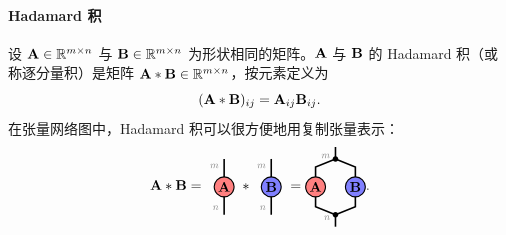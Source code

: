 \paragraph{Hadamard 积}
设 $\mathbf{A}\in\mathbb{R}^{m\times n}$ 与 $\mathbf{B}\in\mathbb{R}^{m\times n}$ 为形状相同的矩阵。$\mathbf{A}$ 与 $\mathbf{B}$ 的 Hadamard 积（或称逐分量积）是矩阵  $\mathbf{A}*\mathbf{B}\in\mathbb{R}^{m\times n}$，按元素定义为 
$$(\mathbf{A}*\mathbf{B})_{ij} = \mathbf{A}_{ij}\mathbf{B}_{ij}.$$
在张量网络图中，Hadamard 积可以很方便地用复制张量表示：
\begin{equation*}
\Ab\hadam\Bb =
     \begin{tikzpicture}[baseline=\baseline]
    \tikzset{tensor/.style = {minimum size = 0.5cm,shape = circle,thick,draw=black,inner sep = 0pt}, edge/.style   = {thick,line width=.4mm},every loop/.style={}}
    \def\y{0}
    \def\x{0}
    \draw[edge] (\x,\y-0.7) -- (\x,\y+0.7)  node [very near end,left] {\edgelabel{$m$}} node [very near start,left] {\edgelabel{$n$}} ;
    \node[tensor,fill=red!50!white] (A) at (\x,\y){$\Ab$};
    \end{tikzpicture} 
    \ \hadam %
    \begin{tikzpicture}[baseline=\baseline]
    \tikzset{tensor/.style = {minimum size = 0.5cm,shape = circle,thick,draw=black,inner sep = 0pt}, edge/.style   = {thick,line width=.4mm},every loop/.style={}}
    \def\y{0}
    \def\x{0}
    \draw[edge] (\x,\y-0.7) -- (\x,\y+0.7)node [very near end,left] {\edgelabel{$m$}} node [very near start,left] {\edgelabel{$n$}} ;
    \node[tensor,fill=blue!50!white] (B) at (\x,\y){$\Bb$};
    \end{tikzpicture}
\ =
\begin{tikzpicture}[baseline=\baseline]
    \tikzset{tensor/.style = {minimum size = 0.5cm,shape = circle,thick,draw=black,inner sep = 0pt}, edge/.style   = {thick,line width=.4mm},every loop/.style={}}
    \def\y{0}
    \def\x{0}
    \node[tensor,fill=red!50!white] (A) at (\x,\y){$\Ab$};
    \node[tensor,fill=blue!50!white] (B) at (\x+1,\y){$\Bb$};
    \draw[edge] (\x,\y+0.25) -- (\x,\y+0.5) -- (\x+0.5,\y+0.7);
    \draw[edge] (\x+1,\y+0.25) -- (\x+1,\y+0.5) -- (\x+0.5,\y+0.7);
    \draw[edge] (\x+0.5,\y+0.7) -- (\x+0.5,\y+1) node [near start,left] {\edgelabel{$m$}};
    \draw  node[fill = black,circle,inner sep=0pt,minimum size=4pt] (m) at (\x+0.5,\y+0.7) {};
    \draw[edge] (\x,\y-0.25) -- (\x,\y-0.5) -- (\x+0.5,\y-0.7);
    \draw[edge] (\x+1,\y-0.25) -- (\x+1,\y-0.5) -- (\x+0.5,\y-0.7);
    \draw[edge] (\x+0.5,\y-0.7) -- (\x+0.5,\y-1) node [near start,left] {\edgelabel{$n$}};
    \draw  node[fill = black,circle,inner sep=0pt,minimum size=4pt] (m) at (\x+0.5,\y-0.7) {};
\end{tikzpicture}.
\end{equation*}
